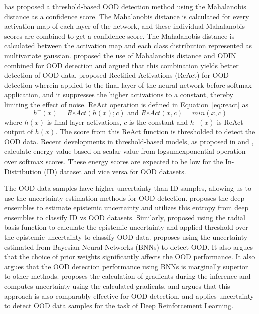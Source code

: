     \cite{lee2018simple_mahalanobis} has proposed a threshold-based OOD detection method using the Mahalanobis distance as a confidence score.
    The Mahalanobis distance is calculated for every activation map of each layer of the network, and these individual Mahalanobis scores are combined to get a confidence score.
    The Mahalanobis distance is calculated between the activation map and each class distribution represented as multivariate gaussian.
    \cite{Maha_plus_ODIN} proposed the use of Mahalanobis distance and ODIN combined for OOD detection and argued that this combination yields better detection of OOD data.
    \cite{ReAct} proposed Rectified Activations (ReAct) for OOD detection wherein applied to the final layer of the neural network before softmax application, and it suppresses the higher activations to a constant, thereby limiting the effect of noise. 
    ReAct operation is defined in Equation~\ref{eq:react} as
    \begin{equation}
        h^{-}(x) = ReAct(h(x); c) \text{ and } ReAct(x, c) = min(x, c) \label{eq:react}
    \end{equation} 
    where $h(x)$ is final layer activations, $c$ is the constant and $h^{-}(x)$ is ReAct output of $h(x)$.
    The score from this ReAct function is thresholded to detect the OOD data. 
    Recent developments in threshold-based models, as proposed in \cite{Energy_OOD_1} and \cite{Energy_OOD_2}, calculate energy value based on scalar value from logsumexponential operation over softmax scores.
    These energy scores are expected to be low for the In-Distribution (ID) dataset and vice versa for OOD datasets.

    The OOD data samples have higher uncertainty than ID samples, allowing us to use the uncertainty estimation methods for OOD detection.
    \cite{lakshminarayanan2016simple} proposes the deep ensembles to estimate epistemic uncertainty and utilizes this entropy from deep ensembles to classify ID vs OOD datasets.
    Similarly, \cite{JAmersfoot_RBF} proposed using the radial basis function to calculate the epistemic uncertainty and applied threshold over the epistemic uncertainty to classify OOD data.
    \cite{UOOD_BNN} proposes using the uncertainty estimated from Bayesian Neural Networks (BNNs) to detect OOD.
    It also argues that the choice of prior weights significantly affects the OOD performance.
    It also argues that the OOD detection performance using BNNs is marginally superior to other methods.
    \cite{Grad_UOOD} proposes the calculation of gradients during the inference and computes uncertainty using the calculated gradients, and argues that this approach is also comparably effective for OOD detection.
    \cite{UOOD_RL1} and \cite{UOOD_RL2} applies uncertainty to detect OOD data samples for the task of Deep Reinforcement Learning.
    
